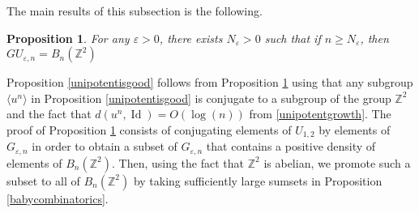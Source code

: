 \documentclass[10pt,reqno]{amsart}
\theoremstyle{Theorem}
\newtheorem{proposition}[theorem]{Proposition}
\newtheorem{claim}[theorem]{Claim}
\theoremstyle{definition}
\theoremstyle{remark}
\newcommand{\note}[1]{\marginpar{{\color{red}\footnotesize \begin{spacing}{1}#1\end{spacing}}}}
\renewcommand{\epsilon}{\varepsilon}
\DeclareMathOperator{\Id}{Id}
\newcommand{\R}{\mathbb {R}}
\newcommand{\Z}{\mathbb {Z}}
\newcommand{\e}{\epsilon}
\newcommand{\Gl}{\mathrm{GL}}
\newcommand{\Sl}{\mathrm{SL}}
\def\red{\color{red}}
\def\blue{}
\begin{document}
The main results of this subsection is the following.
\begin{proposition}\label{finalunipotent} For any $\e>0$, there exists $N_\e > 0$ such that if $n \geq N_{\e}$, then $GU_{\e,n} = B_n(\Z^2)$
\end{proposition}

Proposition \ref{unipotentisgood} follows from Proposition \ref{finalunipotent} using that any  subgroup $\langle u^n \rangle$ in Proposition \ref{unipotentisgood} is conjugate to a subgroup of the group $\Z^2$ and  the fact that  $d(u^n, \Id) = O(\log(n))$ from \eqref{unipotentgrowth}. %
The proof of Proposition \ref{finalunipotent} consists of conjugating elements of $U_{1,2}$ by elements of $G_{\e,n}$ in order to obtain a subset of $G_{\e,n}$ that contains  a positive density  of elements of $B_n(\Z^2)$.  Then, using the fact that $\Z^2$ is abelian, we  promote such a subset to all of $B_n(\Z^2)$  by taking sufficiently large sumsets  in Proposition \ref{babycombinatorics}.



%
%
\end{document}
